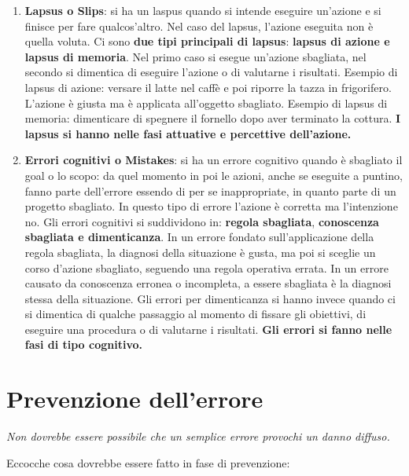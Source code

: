 \documentclass[a4paper,11pt,oneside]{book}
\begin{document}
\begin{enumerate}
	\item \textbf{Lapsus o Slips}: si ha un laspus quando si intende eseguire un'azione e si finisce per fare qualcos'altro. Nel caso del lapsus, l'azione eseguita non è quella voluta. Ci sono \textbf{due tipi principali di lapsus}:
	      \textbf{lapsus di azione e lapsus di memoria}.
	      Nel primo caso si esegue un'azione sbagliata, nel secondo si dimentica di eseguire
	      l'azione o di valutarne i risultati.
	      Esempio di lapsus di azione: versare il latte nel caffè e poi riporre la tazza in frigorifero. L'azione è giusta ma è applicata all'oggetto sbagliato.
	      Esempio di lapsus di memoria: dimenticare di spegnere il fornello dopo aver	terminato la cottura. \textbf{I lapsus si hanno nelle fasi attuative e percettive dell'azione.}
	\item \textbf{Errori cognitivi o Mistakes}: si ha un errore cognitivo quando è sbagliato il goal o lo scopo: da quel momento in poi le azioni, anche se eseguite a puntino, fanno parte dell'errore essendo di per se inappropriate, in quanto parte di un progetto sbagliato. In questo tipo di errore l'azione è corretta ma l'intenzione no.
	      Gli errori cognitivi si suddividono in: \textbf{regola sbagliata}, \textbf{conoscenza sbagliata e dimenticanza}. In un errore fondato sull'applicazione della regola sbagliata, la
	      diagnosi della situazione è gusta, ma poi si sceglie un corso d'azione sbagliato,
	      seguendo una regola operativa errata. In un errore causato da conoscenza erronea
	      o incompleta, a essere sbagliata è la diagnosi stessa della situazione. Gli errori per dimenticanza si hanno invece quando ci si dimentica di qualche passaggio al momento di fissare gli obiettivi, di eseguire una procedura o di valutarne i risultati. \textbf{Gli errori si fanno nelle fasi di tipo cognitivo.}
\end{enumerate}

\pagebreak

\section{Prevenzione dell'errore}

\begin{flushleft}
	\textit{Non dovrebbe essere possibile che un semplice errore provochi un danno diffuso.}
\end{flushleft}

Eccocche cosa dovrebbe essere fatto in fase di prevenzione:
\end{document}
